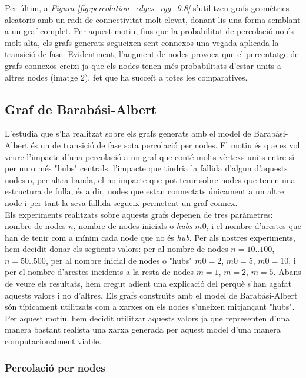 \documentclass[a4paper]{article}
\begin{document}
	Per últim, a \textit{Figura \ref{fig:percolation_edges_rgg_0.8}} s'utilitzen grafs geomètrics aleatoris amb un radi de connectivitat molt elevat, donant-lis una forma semblant a un graf complet. Per aquest motiu, fins que la probabilitat de percolació no és molt alta, els grafs generats segueixen
	sent connexos una vegada aplicada la transició de fase. Evidentment, l'augment de nodes provoca que el percentatge de grafs connexos creixi ja que els nodes tenen més probabilitats d'estar units a altres nodes (imatge 2), fet que ha succeït a totes les comparatives.
	
	\subsection{Graf de Barabási-Albert}
	
	L'estudia que s'ha realitzat sobre els grafs generats amb el model de Barabási-Albert és un de transició de fase sota percolació per nodes. El motiu és que es vol veure l'impacte d'una percolació a un graf que conté molts vèrtexs units entre sí per un o més "hubs" centrals, l'impacte que tindria la fallida d'algun d'aquests nodes o, per altra banda, el no impacte que pot tenir sobre nodes que tenen una estructura de fulla, és a dir, nodes que estan connectats únicament a un altre node i per tant la seva fallida segueix permetent un graf connex. \\
	
	Els experiments realitzats sobre aquests grafs depenen de tres paràmetres: nombre de nodes $n$, nombre de nodes inicials o \textit{hubs} $m0$, i el nombre d'arestes que han de tenir com a mínim cada node que no és \textit{hub}. Per als nostres experiments, hem decidit donar els següents valors: per al nombre de nodes $n = 10..100$, $n = 50..500$, per al nombre inicial de nodes o "hubs" $m0 = 2$, $m0 = 5$, $m0 = 10$, i per el nombre d'arestes incidents a la resta de nodes $m = 1$, $m = 2$, $m = 5$. Abans de veure els resultats, hem cregut adient una explicació del perquè s'han agafat aquests valors i no d'altres. Els grafs construïts amb el model de Barabási-Albert són típicament utilitzats com a xarxes on els nodes s'uneixen mitjançant "hubs". Per aquest motiu, hem decidit utilitzar aquests valors ja que representen d'una manera bastant realista una xarxa generada per aquest model d'una manera computacionalment viable. \\
	
	\subsubsection{Percolació per nodes}
	
\end{document}

